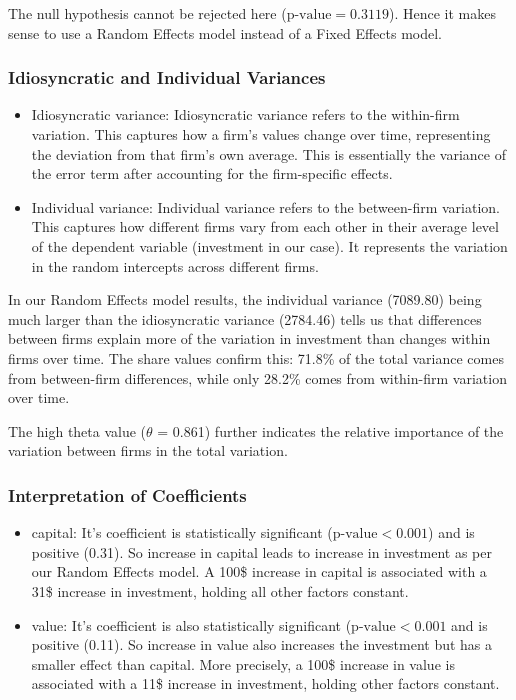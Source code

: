 \documentclass[a4paper]{article}
\begin{document}
The null hypothesis cannot be rejected here (\(\text{p-value} = 0.3119\)). Hence it makes sense to use a Random Effects model instead of a Fixed Effects model.

\subsubsection*{\textbf{Idiosyncratic and Individual Variances}}
\begin{itemize}
    \item Idiosyncratic variance: Idiosyncratic variance refers to the within-firm variation. This captures how a firm's values change over time, representing the deviation from that firm's own average. This is essentially the variance of the error term after accounting for the firm-specific effects.
    \item Individual variance: Individual variance refers to the between-firm variation. This captures how different firms vary from each other in their average level of the dependent variable (investment in our case). It represents the variation in the random intercepts across different firms.
\end{itemize}

In our Random Effects model results, the individual variance (7089.80) being much larger than the idiosyncratic variance (2784.46) tells us that differences between firms explain more of the variation in investment than changes within firms over time. The share values confirm this: 71.8\% of the total variance comes from between-firm differences, while only 28.2\% comes from within-firm variation over time.

The high theta value (\(\theta\) = 0.861) further indicates the relative importance of the variation between firms in the total variation. 

\subsubsection*{\textbf{Interpretation of Coefficients}}
\begin{itemize}
    \item capital: It's coefficient is statistically significant (\(\text{p-value}<0.001\)) and is positive (0.31). So increase in capital leads to increase in investment as per our Random Effects model. A 100\$ increase in capital is associated with a 31\$ increase in investment, holding all other factors constant.
    \item value: It's coefficient is also statistically significant (\(\text{p-value}<0.001\) and is positive (0.11). So increase in value also increases the investment but has a smaller effect than capital. More precisely, a 100\$ increase in value is associated with a 11\$ increase in investment, holding other factors constant.
\end{itemize}
\end{document}
